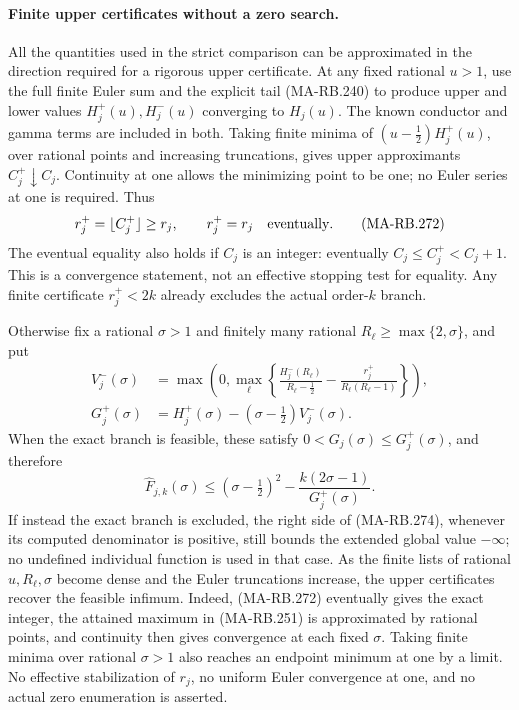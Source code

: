 \paragraph{Finite upper certificates without a zero search.}
All the quantities used in the strict comparison can be
approximated in the direction required for a rigorous upper
certificate. At any fixed rational \(u>1\), use the full
finite Euler sum and the explicit tail (MA-RB.240) to produce
upper and lower values \(H_j^+(u),H_j^-(u)\) converging
to \(H_j(u)\). The known conductor and gamma terms are
included in both. Taking finite minima of
\((u-\tfrac12)H_j^+(u)\), over rational points and increasing
truncations, gives upper approximants \(C_j^+\downarrow C_j\).
Continuity at one allows the minimizing point to be one;
no Euler series at one is required. Thus
\[
 r_j^+=\lfloor C_j^+\rfloor\ge r_j,
 \qquad r_j^+=r_j\quad\hbox{eventually}.
 \tag{MA-RB.272}
\]
The eventual equality also holds if \(C_j\) is an integer:
eventually \(C_j\le C_j^+<C_j+1\). This is a convergence
statement, not an effective stopping test for equality.
Any finite certificate \(r_j^+<2k\) already excludes the
actual order-\(k\) branch.

Otherwise fix a rational \(\sigma>1\) and finitely many
rational \(R_\ell\ge\max\{2,\sigma\}\), and put
\[
 \begin{aligned}
  V_j^-(\sigma)
   &=\max\left(0,\max_\ell
       \left\{\frac{H_j^-(R_\ell)}{R_\ell-\tfrac12}
                       -\frac{r_j^+}{R_\ell(R_\ell-1)}\right\}\right),\\
  G_j^+(\sigma)
   &=H_j^+(\sigma)-(\sigma-\tfrac12)V_j^-(\sigma).
 \end{aligned}
 \tag{MA-RB.273}
\]
When the exact branch is feasible, these satisfy
\(0<G_j(\sigma)\le G_j^+(\sigma)\), and therefore
\[
 \widehat F_{j,k}(\sigma)
    \le(\sigma-\tfrac12)^2
                     -\frac{k(2\sigma-1)}{G_j^+(\sigma)}.
 \tag{MA-RB.274}
\]
If instead the exact branch is excluded, the right side of
(MA-RB.274), whenever its computed denominator is positive,
still bounds the extended global value \(-\infty\); no
undefined individual function is used in that case.
As the finite lists of rational \(u,R_\ell,\sigma\)
become dense and the Euler truncations increase, the upper
certificates recover the feasible infimum. Indeed, (MA-RB.272)
eventually gives the exact integer, the attained maximum in
(MA-RB.251) is approximated by rational points, and continuity
then gives convergence at each fixed \(\sigma\). Taking finite
minima over rational \(\sigma>1\) also reaches an endpoint
minimum at one by a limit. No effective stabilization of
\(r_j\), no uniform Euler convergence at one, and no actual
zero enumeration is asserted.

